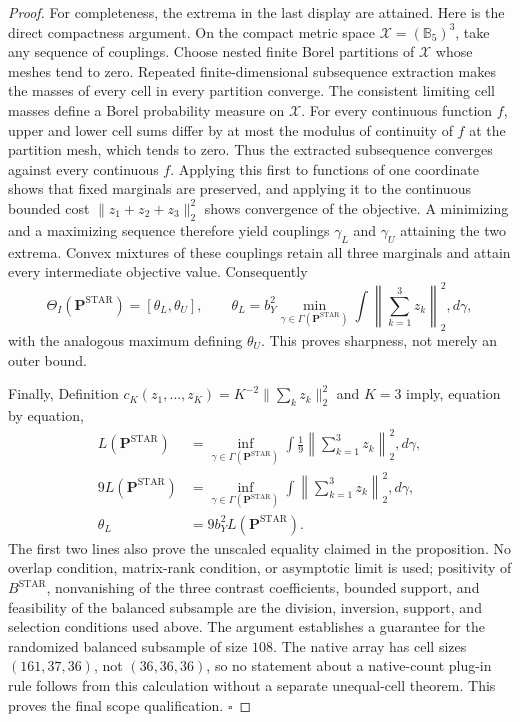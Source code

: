 \documentclass{article}
\begin{document}
\begin{proof}
For completeness, the extrema in the last display are attained.  Here is the
direct compactness argument.  On the compact metric space
\(\mathcal X=(\mathbb B_5)^3\), take any sequence of couplings.  Choose nested
finite Borel partitions of \(\mathcal X\) whose meshes tend to zero.  Repeated
finite-dimensional subsequence extraction makes the masses of every cell in
every partition converge.  The consistent limiting cell masses define a
Borel probability measure on \(\mathcal X\).  For every continuous function
\(f\), upper and lower cell sums differ by at most the modulus of continuity
of \(f\) at the partition mesh, which tends to zero.  Thus the extracted
subsequence converges against every continuous \(f\).  Applying this first to
functions of one coordinate shows that fixed marginals are preserved, and
applying it to the continuous bounded cost
\(\|z_1+z_2+z_3\|_2^2\) shows convergence of the objective.  A minimizing and
a maximizing sequence therefore yield couplings \(\gamma_L\) and
\(\gamma_U\) attaining the two extrema.  Convex mixtures of these couplings
retain all three marginals and attain every intermediate objective value.
Consequently
\[
 \Theta_I(\mathbf P^{\mathrm{STAR}})=[\theta_L,\theta_U],
 \qquad
 \theta_L=b_Y^2\min_{\gamma\in\Gamma(\mathbf P^{\mathrm{STAR}})}
 \int\left\|\sum_{k=1}^3z_k\right\|_2^2,d\gamma,
\]
with the analogous maximum defining \(\theta_U\).  This proves sharpness, not
merely an outer bound.

Finally, Definition \(c_K(z_1,\ldots,z_K)=K^{-2}\|\sum_kz_k\|_2^2\) and
\(K=3\) imply, equation by equation,
\[
\begin{aligned}
 L(\mathbf P^{\mathrm{STAR}})
 &=\inf_{\gamma\in\Gamma(\mathbf P^{\mathrm{STAR}})}
   \int\frac{1}{9}\left\|\sum_{k=1}^3z_k\right\|_2^2,d\gamma,\\
 9L(\mathbf P^{\mathrm{STAR}})
 &=\inf_{\gamma\in\Gamma(\mathbf P^{\mathrm{STAR}})}
   \int\left\|\sum_{k=1}^3z_k\right\|_2^2,d\gamma,\\
 \theta_L&=9b_Y^2L(\mathbf P^{\mathrm{STAR}}).
\end{aligned}
\]
The first two lines also prove the unscaled equality claimed in the
proposition.  No overlap condition, matrix-rank condition, or asymptotic limit
is used; positivity of \(B^{\mathrm{STAR}}\), nonvanishing of the three
contrast coefficients, bounded support, and feasibility of the balanced
subsample are the division, inversion, support, and selection conditions used
above.  The argument establishes a guarantee for the randomized balanced
subsample of size \(108\).  The native array has cell sizes \((161,37,36)\),
not \((36,36,36)\), so no statement about a native-count plug-in rule follows
from this calculation without a separate unequal-cell theorem.  This proves
the final scope qualification. \(\square\)
\end{proof}
\end{document}
